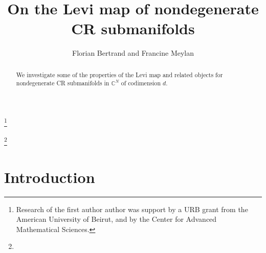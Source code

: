 \documentclass[12pt]{amsart}
\newcommand{\C}{\mathbb C}
\theoremstyle{remark}
\theoremstyle{example}
\theoremstyle{definition}
\numberwithin{equation}{section}
\begin{document}
\begin{abstract}
We investigate some of the properties of the Levi map and related objects for nondegenerate CR submanifolds in $\C^N$ of codimension $d$.    
\end{abstract} 
\thanks{Research of the first author 
author was support by a URB  grant from the American University of Beirut,  and by the Center for Advanced Mathematical Sciences.}



\author[Bertrand, Meylan]{Florian Bertrand and Francine Meylan}
\title[On the Levi map of nondegenerate CR submanifolds]{On the Levi map of nondegenerate CR submanifolds}

\subjclass[2010]{}

\keywords{}
\thanks{}

\maketitle 




\section*{Introduction}
\end{document}
